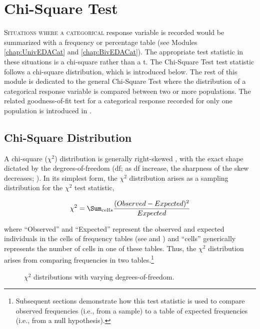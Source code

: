 \documentclass[10pt,openany]{book}\usepackage[]{graphicx}\usepackage[]{color}
\newenvironment{knitrout}{}{} %
\begin{document}
\chapter[Chi-Square Test]{Chi-Square Test} \label{chap:ChiSquare}

\minitoc

\lettrine{S}{ituations where a categorical} response variable is recorded would be summarized with a frequency or percentage table (see Modules \ref{chap:UnivEDACat} and \ref{chap:BivEDACat}). The appropriate test statistic in these situations is a chi-square rather than a t. The Chi-Square Test test statistic follows a chi-square distribution, which is introduced below. The rest of this module is dedicated to the general Chi-Square Test where the distribution of a categorical response variable is compared between two or more populations. The related goodness-of-fit test for a categorical response recorded for only one population is introduced in .


\section{Chi-Square Distribution}\label{sect:ChiDist}
A chi-square ($\chi^2$) distribution is generally right-skewed , with the exact shape dictated by the degrees-of-freedom (df; as df increase, the sharpness of the skew decreases; ). In its simplest form, the $\chi^2$ distribution arises as a sampling distribution for the $\chi^2$ test statistic,

\[ \chi^{2} = \Sum_{cells}\frac{(Observed-Expected)^{2}}{Expected} \]

where ``Observed'' and ``Expected'' represent the observed and expected individuals in the cells of frequency tables (see  and ) and ``cells'' generically represents the number of cells in one of these tables. Thus, the $\chi^2$ distribution arises from comparing frequencies in two tables.\footnote{Subsequent sections demonstrate how this test statistic is used to compare observed frequencies (i.e., from a sample) to a table of expected frequencies (i.e., from a null hypothesis).}

\begin{knitrout}
\color{fgcolor}








\begin{figure}[hbtp]

{\centering {}

}

\caption[$\chi^2$ distributions with varying degrees-of-freedom]{$\chi^2$ distributions with varying degrees-of-freedom.}\label{fig:chiDist}
\end{figure}


\end{knitrout}
\end{document}
